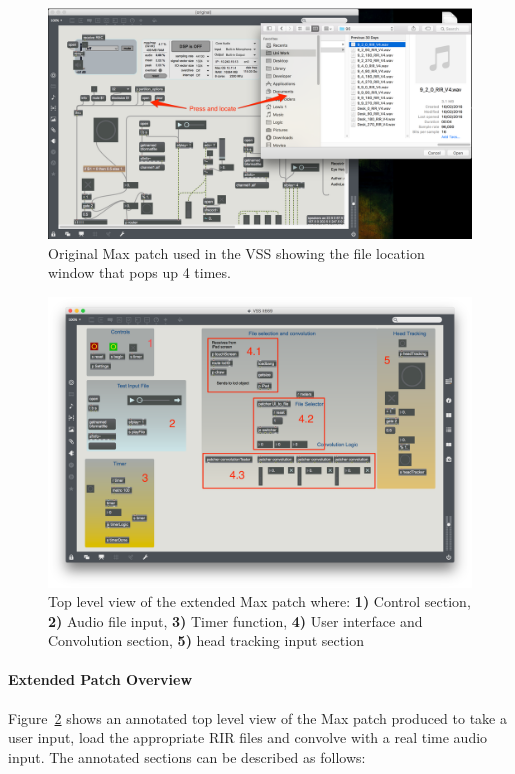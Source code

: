 \documentclass[../../main.tex]{subfiles}
\begin{document}
				\begin{figure}
					\centerline{\includegraphics[width=\textwidth]{Sections/Implementation/Max/images/Max/OriginalPatch_Edit.png}}
					\caption{Original Max patch used in the \ac{VSS} showing the file location window that pops up 4 times.}
					\label{original}
				\end{figure}

				\begin{figure}
					\centerline{\includegraphics[scale = 0.35]{Sections/Implementation/Max/images/Max/MyPatch_Edit.png}}
					\caption{Top level view of the extended Max patch where: \textbf{1)} Control section, \textbf{2)} Audio file input, \textbf{3)} Timer function, \textbf{4)} User interface and Convolution section, \textbf{5)} head tracking input section}
					\label{myPatch}
				\end{figure}

			\paragraph{Extended Patch Overview}
				Figure~\ref{myPatch} shows an annotated top level view of the Max patch produced to take a user input, load the appropriate \ac{RIR} files and convolve with a real time audio input. The annotated sections can be described as follows:
\end{document}
